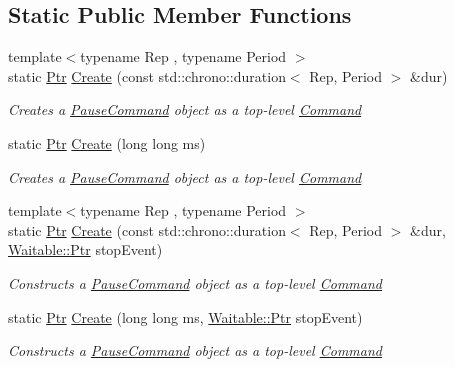 \subsection*{Static Public Member Functions}
\begin{DoxyCompactItemize}
\item 
{\footnotesize template$<$typename Rep , typename Period $>$ }\\static \mbox{\hyperlink{class_command_lib_1_1_command_a3b3e4f00144373299df5c6bb1acc319d}{Ptr}} \mbox{\hyperlink{class_command_lib_1_1_pause_command_acf08990d56d99bcec76588d786c980e7}{Create}} (const std\+::chrono\+::duration$<$ Rep, Period $>$ \&dur)
\begin{DoxyCompactList}\small\item\em Creates a \mbox{\hyperlink{class_command_lib_1_1_pause_command}{Pause\+Command}} object as a top-\/level \mbox{\hyperlink{class_command_lib_1_1_command}{Command}}\end{DoxyCompactList}\item 
static \mbox{\hyperlink{class_command_lib_1_1_command_a3b3e4f00144373299df5c6bb1acc319d}{Ptr}} \mbox{\hyperlink{class_command_lib_1_1_pause_command_a8c0effc409aae3b87b2126261599f77b}{Create}} (long long ms)
\begin{DoxyCompactList}\small\item\em Creates a \mbox{\hyperlink{class_command_lib_1_1_pause_command}{Pause\+Command}} object as a top-\/level \mbox{\hyperlink{class_command_lib_1_1_command}{Command}}\end{DoxyCompactList}\item 
{\footnotesize template$<$typename Rep , typename Period $>$ }\\static \mbox{\hyperlink{class_command_lib_1_1_command_a3b3e4f00144373299df5c6bb1acc319d}{Ptr}} \mbox{\hyperlink{class_command_lib_1_1_pause_command_a907d1e6292bfbe4af719515534363c40}{Create}} (const std\+::chrono\+::duration$<$ Rep, Period $>$ \&dur, \mbox{\hyperlink{class_command_lib_1_1_waitable_ac74b6b91e48220146eada76a31cf2d9b}{Waitable\+::\+Ptr}} stop\+Event)
\begin{DoxyCompactList}\small\item\em Constructs a \mbox{\hyperlink{class_command_lib_1_1_pause_command}{Pause\+Command}} object as a top-\/level \mbox{\hyperlink{class_command_lib_1_1_command}{Command}}\end{DoxyCompactList}\item 
static \mbox{\hyperlink{class_command_lib_1_1_command_a3b3e4f00144373299df5c6bb1acc319d}{Ptr}} \mbox{\hyperlink{class_command_lib_1_1_pause_command_a76090daf88f99b4e36414a853f3eb447}{Create}} (long long ms, \mbox{\hyperlink{class_command_lib_1_1_waitable_ac74b6b91e48220146eada76a31cf2d9b}{Waitable\+::\+Ptr}} stop\+Event)
\begin{DoxyCompactList}\small\item\em Constructs a \mbox{\hyperlink{class_command_lib_1_1_pause_command}{Pause\+Command}} object as a top-\/level \mbox{\hyperlink{class_command_lib_1_1_command}{Command}}\end{DoxyCompactList}\end{DoxyCompactItemize}
